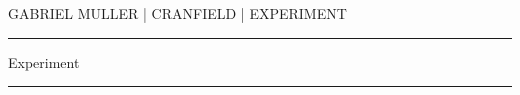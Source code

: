 \documentclass[paper=a4, fontsize=11pt]{scrartcl}
\begin{document}
\begin{center}
\MakeUppercase{Gabriel Muller | Cranfield | Experiment} 
\end{center}

\rule{\linewidth}{1pt}
\begin{center}
\huge{Experiment}
\end{center}
\rule{\linewidth}{1pt}\\


\end{document}
